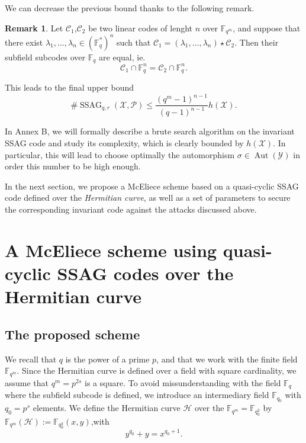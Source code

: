 \documentclass[10pt]{article}
\theoremstyle{definition}
\newtheorem{rq1}[thm]{Remark}
\theoremstyle{definition}
\theoremstyle{definition}
\newcommand{\C}{\mathcal{C}}
\newcommand{\calH}{\mathcal{H}}
\newcommand{\Fqm}{\mathbb{F}_{q^m}}
\newcommand{\Fq}{\mathbb{F}_q}
\newcommand{\X}{\mathcal{X}}
\newcommand{\Y}{\mathcal{Y}}
\newcommand{\PR}{\mathcal{P}}
\newcommand{\Aut}{\operatorname{Aut}}
\newcommand{\ssag}{\operatorname{SSAG}}
\begin{document}
We can decrease the previous bound thanks to the following remark.

\begin{rq1}
Let $\C_1$,$\C_2$ be two linear codes of lenght $n$ over $\Fqm$, and suppose that there exist $\lambda_1,...,\lambda_n \in (\Fq^*)^n$ such that $\C_1 = (\lambda_1,...,\lambda_n) \star \C_2$. Then their subfield subcodes over $\Fq$ are equal, ie.
\[\C_1 \cap \Fq^n = \C_2 \cap \Fq^n.\]
\end{rq1}

This leads to the final upper bound 
\begin{equation} \label{nb of sssag}
 \#\ssag_{q,r}(\X,\PR) \leq \dfrac{(q^m-1)^{n-1}}{(q-1)^{n-1}}h(\X).
\end{equation} 

In Annex B, we will formally describe a brute search algorithm on the invariant SSAG code and study its complexity, which is clearly bounded by $h(\X)$. In particular, this will lead to choose optimally the automorphism $\sigma \in \Aut(\Y)$ in order this number to be high enough.



In the next section, we propose a McEliece scheme based on a quasi-cyclic SSAG code defined over the \textit{Hermitian curve}, as well as a set of parameters to secure the corresponding invariant code against the attacks discussed above.


\section{A McEliece scheme using quasi-cyclic SSAG codes over the Hermitian curve}


\subsection{The proposed scheme}


We recall that $q$ is the power of a prime $p$, and that we work with the finite field $\Fqm$. Since the Hermitian curve is defined over a field with square cardinality, we assume that $q^m = p^{2s}$ is a square. To avoid missunderstanding with the field $\Fq$  where the subfield subcode is defined, we introduce an intermediary field $\mathbb{F}_{q_0}$ with $q_0 = p^s$ elements.   
We define the Hermitian curve $\calH$ over the $\Fqm = \mathbb{F}_{q_0^2}$ by \\ $\Fqm(\calH):=\mathbb{F}_{q_0^2}(x,y)$,with 
\begin{equation} \label{hermi}
y^{q_0}+y=x^{q_0+1}.
\end{equation}
\end{document}
